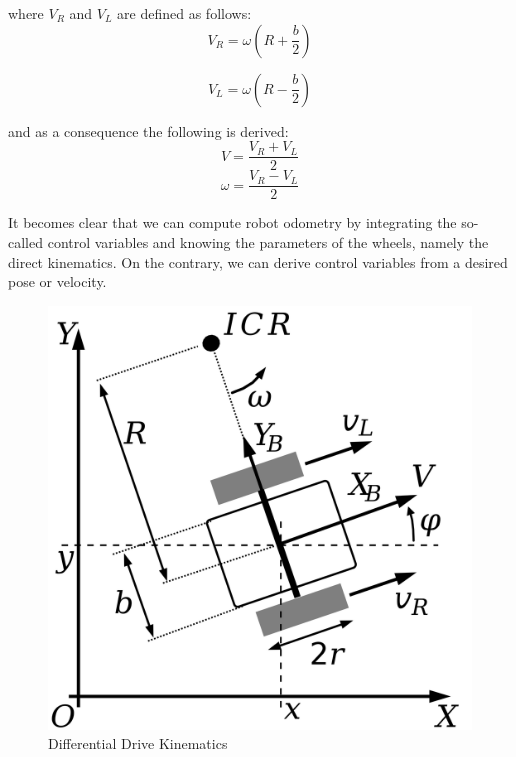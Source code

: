 where $V_{R}$ and $V_{L}$ are defined as follows:
\begin{equation}
    V_{R} = \omega (R + \frac{b}{2}) 
\end{equation}

\begin{equation}
        V_{L} = \omega (R - \frac{b}{2})
\end{equation}

and as a consequence the following is derived:
\begin{equation}
    V = \frac{V_{R} + V_{L}}{2}
\end{equation}
\begin{equation}
    \omega = \frac{V_{R} - V_{L}}{2}
\end{equation}

It becomes clear that we can compute robot odometry by integrating the so-called control variables and knowing the parameters of the wheels, namely the direct kinematics.
On the contrary, we can derive control variables from a desired pose or velocity.


\begin{figure}[H]
    \centering
    \includegraphics[scale=0.10]{Images/Chapter 3/diffdrive.png}
    \caption{Differential Drive Kinematics}
    \label{fig:diffdrive}
\end{figure}

